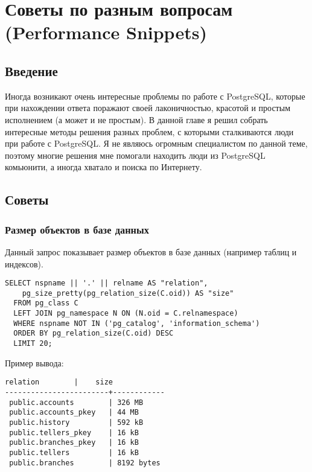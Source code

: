 \chapter{Советы по разным вопросам (Performance Snippets)}
\begin{epigraphs}
\end{epigraphs}

\section{Введение}
Иногда возникают очень интересные проблемы по работе с PostgreSQL, которые при нахождении ответа поражают своей лаконичностью, 
красотой и простым исполнением (а может и не простым). В данной главе я решил собрать интересные методы решения разных проблем, с 
которыми сталкиваются люди при работе с PostgreSQL. Я не являюсь огромным специалистом по данной теме, поэтому многие решения 
мне помогали находить люди из PostgreSQL комьюнити, а иногда хватало и поиска по Интернету. 

\section{Советы}

\subsection{Размер объектов в базе данных}
Данный запрос показывает размер объектов в базе данных (например таблиц и индексов).

\begin{lstlisting}[label=lst:snippets1,title=snippets/biggest\_relations.sql]
SELECT nspname || '.' || relname AS "relation",
    pg_size_pretty(pg_relation_size(C.oid)) AS "size"
  FROM pg_class C
  LEFT JOIN pg_namespace N ON (N.oid = C.relnamespace)
  WHERE nspname NOT IN ('pg_catalog', 'information_schema')
  ORDER BY pg_relation_size(C.oid) DESC
  LIMIT 20;
\end{lstlisting}

Пример вывода:
\begin{lstlisting}[label=lst:snippets2,caption=Поиск самых больших объектов в БД. Пример вывода]
        relation        |    size    
------------------------+------------
 public.accounts        | 326 MB
 public.accounts_pkey   | 44 MB
 public.history         | 592 kB
 public.tellers_pkey    | 16 kB
 public.branches_pkey   | 16 kB
 public.tellers         | 16 kB
 public.branches        | 8192 bytes
\end{lstlisting}

